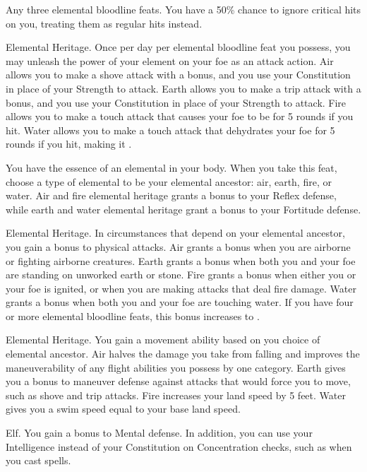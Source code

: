
\featpre Any three elemental bloodline feats.
\featben You have a 50\% chance to ignore critical hits on you, treating them as regular hits instead.

\featpre Elemental Heritage.
\featben Once per day per elemental bloodline feat you possess, you may unleash the power of your element on your foe as an attack action.
Air allows you to make a shove attack with a  bonus, and you use your Constitution in place of your Strength to attack.
Earth allows you to make a trip attack with a  bonus, and you use your Constitution in place of your Strength to attack.
Fire allows you to make a touch attack that causes your foe to be \ignited for 5 rounds if you hit.
Water allows you to make a touch attack that dehydrates your foe for 5 rounds if you hit, making it \fatigued.

\featben You have the essence of an elemental in your body.
When you take this feat, choose a type of elemental to be your elemental ancestor: air, earth, fire, or water.
Air and fire elemental heritage grants a  bonus to your Reflex defense, while earth and water elemental heritage grant a  bonus to your Fortitude defense.

\featpre Elemental Heritage.
\featben In circumstances that depend on your elemental ancestor, you gain a  bonus to physical attacks.
Air grants a bonus when you are airborne or fighting airborne creatures.
Earth grants a bonus when both you and your foe are standing on unworked earth or stone.
Fire grants a bonus when either you or your foe is ignited, or when you are making attacks that deal fire damage.
Water grants a bonus when both you and your foe are touching water.
If you have four or more elemental bloodline feats, this bonus increases to .

\featpre Elemental Heritage.
\featben You gain a movement ability based on you choice of elemental ancestor.
Air halves the damage you take from falling and improves the maneuverability of any flight abilities you possess by one category.
Earth gives you a  bonus to maneuver defense against attacks that would force you to move, such as shove and trip attacks.
Fire increases your land speed by 5 feet.
Water gives you a swim speed equal to your base land speed.

\featpre Elf.
\featben You gain a  bonus to Mental defense.
In addition, you can use your Intelligence instead of your Constitution on Concentration checks, such as when you cast spells.

